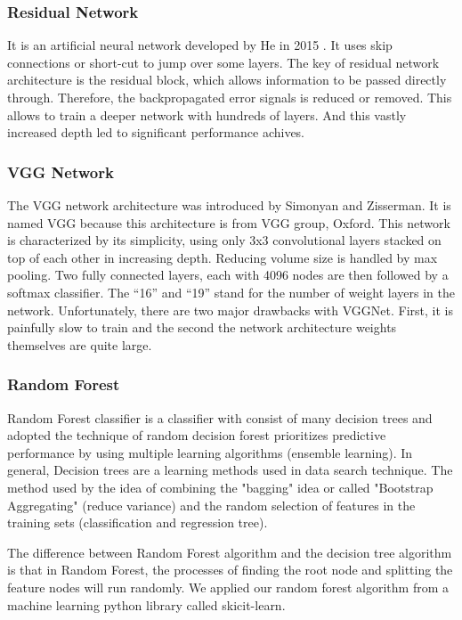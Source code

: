 \documentclass[12pt]{article}
\begin{document}
\subsubsection{Residual Network}
It is an artificial neural network developed by He in 2015 \cite{he2016deep}. It uses skip connections or short-cut to jump over some layers. The key of residual network architecture is the residual block, which allows information to be passed directly through. Therefore, the backpropagated error signals is reduced or removed. This allows to train a deeper network with hundreds of layers. And this vastly increased depth led to significant performance achives.
\subsubsection{VGG Network}
The VGG network architecture was introduced by Simonyan and Zisserman\cite{simonyan2014very}. It is named VGG because this architecture is from VGG group, Oxford. This network is characterized by its simplicity, using only 3x3 convolutional layers stacked on top of each other in increasing depth. Reducing volume size is handled by max pooling. Two fully connected layers, each with 4096 nodes are then followed by a softmax classifier. The “16” and “19” stand for the number of weight layers in the network. Unfortunately, there are two major drawbacks with VGGNet. First, it is painfully slow to train and the second the network architecture weights themselves are quite large.
\subsubsection{Random Forest}
Random Forest classifier is a classifier with consist of many decision trees and adopted the technique of random decision forest prioritizes predictive performance by using multiple learning algorithms (ensemble learning). In general, Decision trees are a learning methods used in data search technique. The method used by the idea of combining the "bagging" idea or called "Bootstrap Aggregating" (reduce variance) and the random selection of features in the training sets (classification and regression tree). 
\par
The difference between Random Forest algorithm and the decision tree algorithm is that in Random Forest, the processes of finding the root node and splitting the feature nodes will run randomly. We applied our random forest algorithm from a machine learning python library called skicit-learn\cite{pedregosa2011scikit}.
\end{document}
